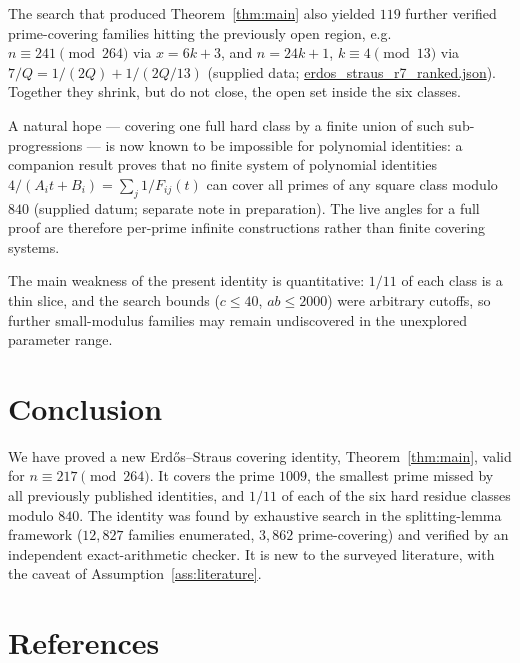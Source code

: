 \documentclass[11pt,a4paper]{article}
\theoremstyle{definition}
\begin{document}
The search that produced Theorem~\ref{thm:main} also yielded $119$ further
verified prime-covering families hitting the previously open region, e.g.\
$n \equiv 241 \pmod{264}$ via $x = 6k+3$, and $n = 24k+1$, $k \equiv 4
\pmod{13}$ via $7/Q = 1/(2Q) + 1/(2Q/13)$ (supplied data;
\url{erdos_straus_r7_ranked.json}). Together they shrink, but do not
close, the open set inside the six classes.

A natural hope --- covering one full hard class by a finite union of such
sub-progressions --- is now known to be impossible for polynomial
identities: a companion result proves that no finite system of polynomial
identities $4/(A_it+B_i) = \sum_j 1/F_{ij}(t)$ can cover all primes of any
square class modulo $840$ (supplied datum; separate note in preparation).
The live angles for a full proof are therefore per-prime infinite
constructions rather than finite covering systems.

The main weakness of the present identity is quantitative: $1/11$ of each
class is a thin slice, and the search bounds ($c \leq 40$, $ab \leq 2000$)
were arbitrary cutoffs, so further small-modulus families may remain
undiscovered in the unexplored parameter range.

\section{Conclusion}

We have proved a new Erd\H{o}s--Straus covering identity,
Theorem~\ref{thm:main}, valid for $n \equiv 217 \pmod{264}$. It covers the
prime $1009$, the smallest prime missed by all previously published
identities, and $1/11$ of each of the six hard residue classes modulo
$840$. The identity was found by exhaustive search in the splitting-lemma
framework ($12{,}827$ families enumerated, $3{,}862$ prime-covering) and
verified by an independent exact-arithmetic checker. It is new to the
surveyed literature, with the caveat of Assumption~\ref{ass:literature}.

\section{References}
\end{document}
